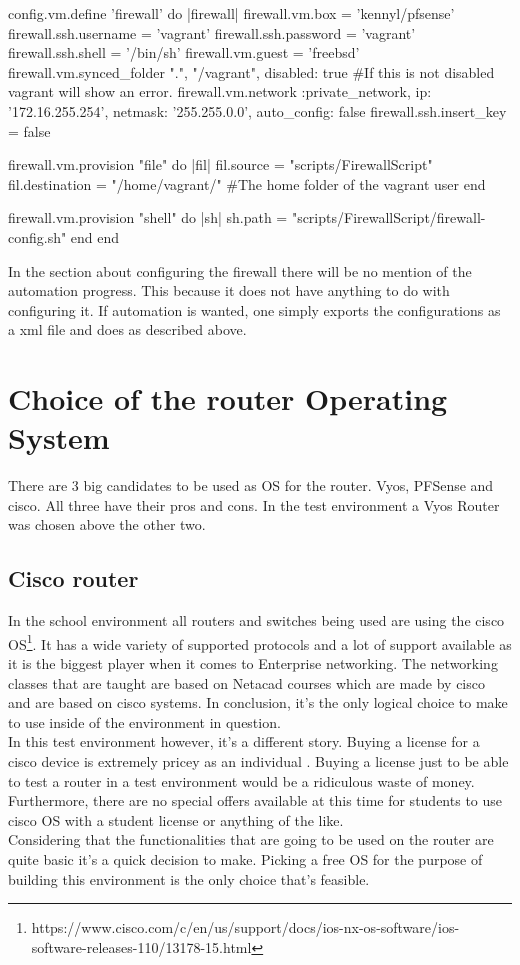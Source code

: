 \begin{cisco}[title=PFSense automation in the vagrantfile]
  config.vm.define 'firewall' do |firewall|
    firewall.vm.box = 'kennyl/pfsense'
    firewall.ssh.username = 'vagrant'
    firewall.ssh.password = 'vagrant'
    firewall.ssh.shell = '/bin/sh'
    firewall.vm.guest = 'freebsd'
    firewall.vm.synced_folder ".", "/vagrant", disabled: true #If this is not disabled vagrant will show an error.
    firewall.vm.network :private_network,
      ip: '172.16.255.254',
      netmask: '255.255.0.0',
      auto_config: false
    firewall.ssh.insert_key = false

    firewall.vm.provision "file" do |fil|
      fil.source = "scripts/FirewallScript"
      fil.destination = "/home/vagrant/" #The home folder of the vagrant user
    end

    firewall.vm.provision "shell" do |sh|
      sh.path = "scripts/FirewallScript/firewall-config.sh"
    end
  end
\end{cisco}
In the section about configuring the firewall there will be no mention of the automation progress. This because it does not have anything to do with configuring it. If automation is wanted, one simply exports the configurations as a xml file and does as described above.
\section{ Choice of the router Operating System }
There are 3 big candidates to be used as OS for the router. Vyos, PFSense and cisco. All three have their pros and cons. In the test environment a Vyos Router was chosen above the other two.
\subsection{ Cisco router}
In the school environment all routers and switches being used are using the cisco OS\footnote{
https://www.cisco.com/c/en/us/support/docs/ios-nx-os-software/ios-software-releases-110/13178-15.html}. It has a wide variety of supported protocols and a lot of support available as it is the biggest player when it comes to Enterprise networking\textcite{ciscoRich}. The networking classes that are taught are based on Netacad courses which are made by cisco and are based on cisco systems. In conclusion, it's the only logical choice to make to use inside of the environment in question. \\
In this test environment however, it's a different story. Buying a license for a cisco device is extremely pricey as an individual . Buying a license just to be able to test a router in a test environment would be a ridiculous waste of money. Furthermore, there are no special offers available at this time for students to use cisco OS with a student license or anything of the like. \\
Considering that the functionalities that are going to be used on the router are quite basic it's a quick decision to make. Picking a free OS for the purpose of building this environment is the only choice that's feasible.

